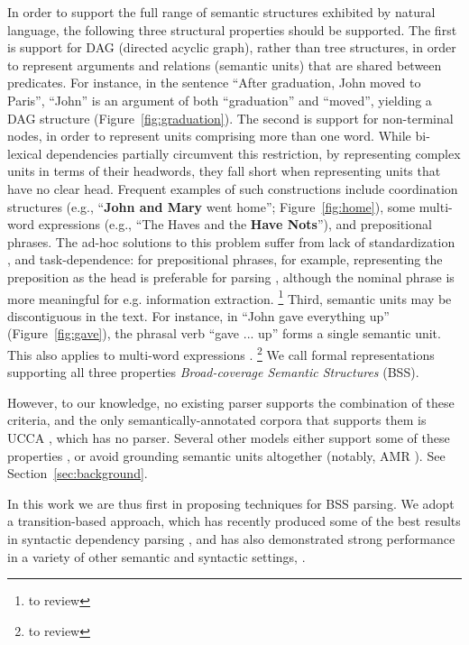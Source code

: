 \documentclass[11pt]{article}
\newcommand{\daniel}[1]{\footnote{\color{blue} #1}}
\newcommand{\secref}[1]{Section~\ref{#1}}
\newcommand{\figref}[1]{Figure~\ref{#1}}
\begin{document}
In order to support the full range of semantic structures exhibited by
natural language, the following three structural properties should be supported.
The first is support for DAG (directed acyclic graph), rather than tree structures,
in order to represent arguments and relations (semantic units)
that are shared between predicates.
For instance, in the sentence
``After graduation, John moved to Paris'', ``John'' is an argument of both ``graduation''
and ``moved'', yielding a DAG structure (\figref{fig:graduation}).
The second is support for non-terminal nodes, in order to represent units
comprising more than one word.
While bi-lexical dependencies partially circumvent this restriction, by
representing complex units in terms of their headwords, they fall short
when representing units that have no clear head.
Frequent examples of such constructions include
coordination structures (e.g., ``{\bf John and Mary} went home''; \figref{fig:home}),
some multi-word expressions (e.g., ``The Haves and the {\bf Have Nots}''),
and prepositional phrases.
The ad-hoc solutions to this problem suffer from lack of standardization \cite{Ivanova2012who},
and task-dependence: for prepositional phrases, for example,
representing the preposition as the head is preferable for
parsing \cite{Schwartz:12}, although the nominal phrase is more meaningful for e.g. information extraction.
\daniel{to review}
Third, semantic units may be discontiguous in the text. For instance, in ``John gave everything up''
(\figref{fig:gave}), the phrasal verb ``gave ... up'' forms a single semantic unit.
This also applies to multi-word expressions \cite{schneider2014discriminative}. \daniel{to review}
We call formal representations supporting all three properties 
{\it Broad-coverage Semantic Structures} (BSS).

However, to our knowledge, no existing parser supports the combination of these criteria,
and the only semantically-annotated corpora that supports them is UCCA \cite{abend2013universal},
which has no parser.
Several other models either support some of these properties \cite{oepen2015semeval},
or avoid grounding semantic units altogether
(notably, AMR \cite{banarescu2013abstract}). See \secref{sec:background}.

In this work we are thus first in proposing techniques for BSS parsing.
We adopt a transition-based approach, which has recently produced some of the best
results in syntactic dependency parsing
\cite{dyer2015transition,ballesteros2015improved}, and has also demonstrated
strong performance in a variety of other semantic and syntactic settings,
\cite[among others]{maier2015discontinuous,wang2015transition}.
\end{document}
